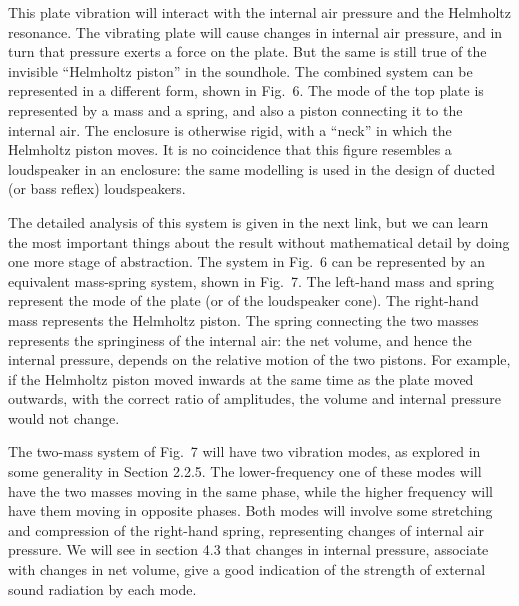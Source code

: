   This plate vibration will interact with the internal air pressure and the 
  Helmholtz resonance. The vibrating plate will cause changes in internal air 
  pressure, and in turn that pressure exerts a force on the plate. But the same 
  is still true of the invisible ``Helmholtz piston'' in the soundhole. The 
  combined system can be represented in a different form, shown in Fig.\ 6. The 
  mode of the top plate is represented by a mass and a spring, and also a 
  piston connecting it to the internal air. The enclosure is otherwise rigid, 
  with a ``neck'' in which the Helmholtz piston moves. It is no coincidence 
  that this figure resembles a loudspeaker in an enclosure: the same modelling 
  is used in the design of ducted (or bass reflex) loudspeakers. 


  The detailed analysis of this system is given in the next link, but we can 
  learn the most important things about the result without mathematical detail 
  by doing one more stage of abstraction. The system in Fig.\ 6 can be 
  represented by an equivalent mass-spring system, shown in Fig.\ 7. The 
  left-hand mass and spring represent the mode of the plate (or of the 
  loudspeaker cone). The right-hand mass represents the Helmholtz piston. The 
  spring connecting the two masses represents the springiness of the internal 
  air: the net volume, and hence the internal pressure, depends on the relative 
  motion of the two pistons. For example, if the Helmholtz piston moved inwards 
  at the same time as the plate moved outwards, with the correct ratio of 
  amplitudes, the volume and internal pressure would not change. 


  The two-mass system of Fig.\ 7 will have two vibration modes, as explored in 
  some generality in Section 2.2.5. The lower-frequency one of these modes will 
  have the two masses moving in the same phase, while the higher frequency will 
  have them moving in opposite phases. Both modes will involve some stretching 
  and compression of the right-hand spring, representing changes of internal 
  air pressure. We will see in section 4.3 that changes in internal pressure, 
  associate with changes in net volume, give a good indication of the strength 
  of external sound radiation by each mode. 

